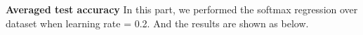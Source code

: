 \documentclass{article} %
\begin{document}
\begin{figure}[htb]
    
\end{figure}

\textbf{Averaged test accuracy}
In this part, we performed the softmax regression over dataset when learning rate = 0.2. 
And the results are shown as below.
\end{document}
